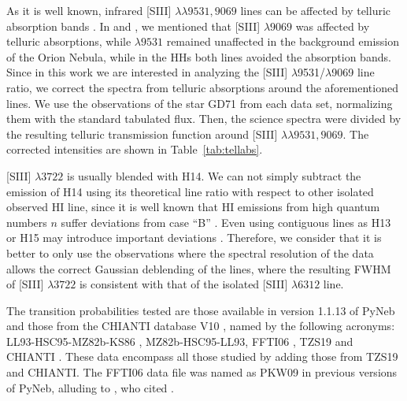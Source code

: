 \documentclass[fleqn,usenatbib]{mnras}
\begin{document}
As it is well known, infrared [S\thinspace III] $\lambda \lambda 9531, 9069$ lines can be affected by telluric absorption bands \citep{Noll12}. In \citet{mendez2021} and \citet{mendez2021-2}, we mentioned that [S\thinspace III] $\lambda 9069$ was affected by telluric absorptions, while $\lambda 9531$ remained unaffected in the background emission of the Orion Nebula, while in the HHs both lines avoided the absorption bands. Since in this work we are interested in analyzing the [S\thinspace III] $\lambda$9531/$\lambda$9069 line ratio, we correct the spectra from telluric absorptions around the aforementioned lines. We use the observations of the star GD71 from each data set, normalizing them with the standard tabulated flux. Then, the science spectra were divided by the resulting telluric transmission function around [S\thinspace III] $\lambda \lambda 9531, 9069$. The corrected intensities are shown in Table~\ref{tab:tellabs}. 

[S\thinspace III] $\lambda 3722$ is usually blended with H14. We can not simply subtract the emission of H14 using its theoretical line ratio with respect to other isolated observed H\thinspace I line, since it is well known that H\thinspace I emissions from high quantum numbers $n$ suffer deviations from case ``B'' \citep[][]{mesadelgado09, rodriguez20}. Even using  contiguous lines as H13 or H15 may introduce important deviations \citep[see fig.~A2 of][]{rodriguez20}. Therefore, we consider that it is better to only use the observations where the spectral resolution of the data allows the correct Gaussian deblending of the lines, where the resulting FWHM of [S\thinspace III] $\lambda 3722$ is consistent with that of the isolated [S\thinspace III] $\lambda 6312$ line.

The transition probabilities tested are those available in version 1.1.13 of PyNeb and those from the CHIANTI database V10 \citep[][]{Chianti10}, named by the following acronyms: LL93-HSC95-MZ82b-KS86 \citep[][]{LL93,HSC95,MZ82b, KS86}, MZ82b-HSC95-LL93\citep[][]{MZ82b,HSC95,LL93}, FFTI06 \citep[][]{FFTI06}, TZS19\citep[][]{TZS19} and CHIANTI \citep[][]{Tayal97,FFTI06, Hudson12}. These data encompass all those studied by \citet{Juan-de-Dios17} adding  those from TZS19 and CHIANTI. The FFTI06 data file  was named as PKW09 in previous versions of PyNeb, alluding to \citet{Podobedova09}, who cited \citet{FFTI06}. 
\end{document}

